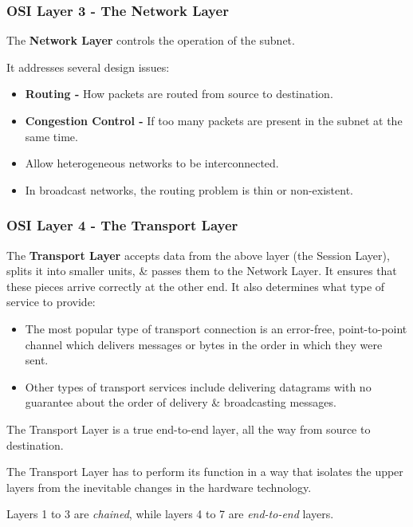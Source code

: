 \documentclass[11pt]{article}
\begin{document}
\subsubsection{OSI Layer 3 - The Network Layer} 
The \textbf{Network Layer} controls the operation of the subnet. 

It addresses several design issues:
\begin{itemize}
    \item   \textbf{Routing -} How packets are routed from source to destination. 
    \item   \textbf{Congestion Control -} If too many packets are present in the subnet at the same time. 
    \item   Allow heterogeneous networks to be interconnected. 
    \item   In broadcast networks, the routing problem is thin or non-existent.
\end{itemize} 

\subsubsection{OSI Layer 4 - The Transport Layer}
The \textbf{Transport Layer} accepts data from the above layer (the Session Layer), splits it into smaller units, \& passes 
them to the Network Layer. 
It ensures that these pieces arrive correctly at the other end. 
It also determines what type of service to provide:
\begin{itemize}
    \item   The most popular type of transport connection is an error-free, point-to-point channel which delivers messages or 
            bytes in the order in which they were sent.
    \item   Other types of transport services include delivering datagrams with no guarantee about the order of delivery \&
            broadcasting messages. 
\end{itemize} 

The Transport Layer is a true end-to-end layer, all the way from source to destination. 

The Transport Layer has to perform its function in a way that isolates the upper layers from the inevitable changes in the 
hardware technology. 

Layers 1 to 3 are \textit{chained}, while layers 4 to 7 are \textit{end-to-end} layers. 
\end{document}

